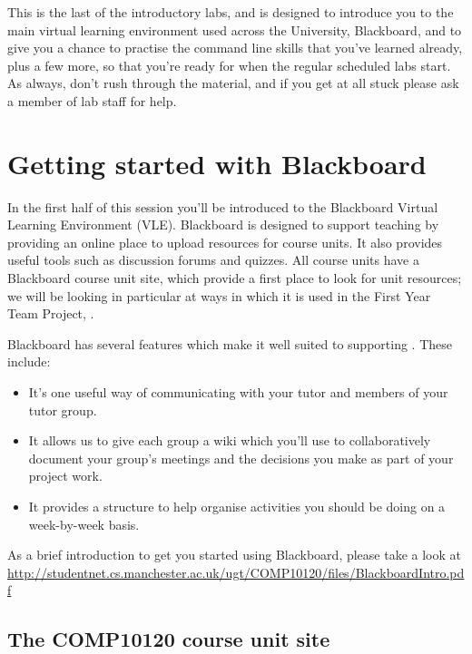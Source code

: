 \begin{firstonly}

  This is the last of the introductory labs, and is designed to
  introduce you to the main virtual learning environment used across
  the University, Blackboard, and to give you a chance to practise the
  command line skills that you've learned already, plus a few more, so
  that you're ready for when the regular scheduled labs start. As
  always, don't rush through the material, and if you get at all stuck
  please ask a member of lab staff for help.

\section{Getting started with Blackboard}
\label{sec:introduction-blackboard}

In the first half of this session you'll be introduced to the Blackboard Virtual Learning Environment (VLE). Blackboard is designed to support  teaching by providing an online place to upload resources for course units. It also provides useful tools such as discussion forums and quizzes. All course units have a  Blackboard course unit site, which provide a first place to look for unit resources; we will be looking in particular at ways in which it is used in the First Year Team Project, .

Blackboard has several features which make it well suited to supporting . These include:
\begin{itemize}
\item It's one useful way of communicating with your tutor and members of your tutor group.
\item It allows us to give each group a wiki which you'll use to collaboratively document your group's meetings and the decisions you make as part of  your project work.
\item It provides a structure to help organise activities you should be doing on a week-by-week basis.
\end{itemize}

As a brief introduction to get you started using Blackboard, please take a look at \\ {\small\url{http://studentnet.cs.manchester.ac.uk/ugt/COMP10120/files/BlackboardIntro.pdf}}

\subsection{The COMP10120 course unit site}
\label{sec:comp10120-course-uni}


\end{firstonly}
